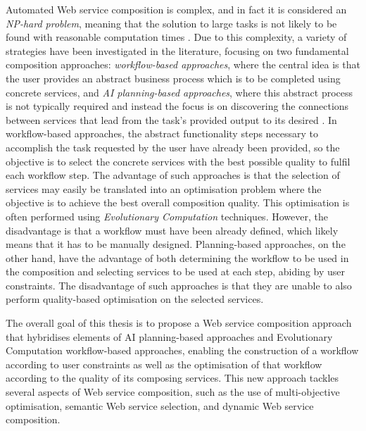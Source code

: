 Automated Web service composition is complex, and in fact it is considered an \textit{NP-hard problem}, meaning that the solution to large tasks is not likely to be found with reasonable computation times \cite{moghaddam2014service}. Due to this complexity, a variety of strategies have been investigated in the literature, focusing on two fundamental composition approaches: \textit{workflow-based approaches}, where the central idea is that the user provides an abstract business process which is to be completed using concrete services, and \textit{AI planning-based approaches}, where this abstract process is not typically required and instead the focus is on discovering the connections between services that lead from the task's provided output to its desired \cite{moghaddam2014service}. In workflow-based approaches, the abstract functionality steps necessary to accomplish the task requested by the user have already been provided, so the objective is to select the concrete services with the best possible quality to fulfil each workflow step. The advantage of such approaches is that the selection of services may easily be translated into an optimisation problem where the objective is to achieve the best overall composition quality. This optimisation is often performed using \textit{Evolutionary Computation} techniques. However, the disadvantage is that a workflow must have been already defined, which likely means that it has to be manually designed. Planning-based approaches, on the other hand, have the advantage of both determining the workflow to be used in the composition and selecting services to be used at each step, abiding by user constraints. The disadvantage of such approaches is that they are unable to also perform quality-based optimisation on the selected services.

The overall goal of this thesis is to propose a Web service composition approach that hybridises elements of AI planning-based approaches and Evolutionary Computation workflow-based approaches, enabling the construction of a workflow according to user constraints as well as the optimisation of that workflow according to the quality of its composing services. This new approach tackles several aspects of Web service composition, such as the use of multi-objective optimisation, semantic Web service selection, and dynamic Web service composition.

